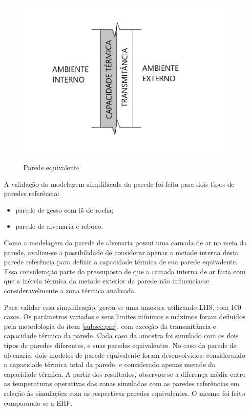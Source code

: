 \documentclass[brazil,hardcopy,openany,a5paper]{ufscthesis}
\begin{document}
		\begin{figure}[h]
			\centering
			\caption{Parede equivalente}
			\includegraphics[width=1\linewidth]{img/parede_eq.png}
			\label{fig:parede_eq}
		\end{figure}
	
		A validação da modelagem simplificada da parede foi feita para dois tipos de paredes referência:
		
		\begin{itemize}
			\item parede de gesso com lã de rocha;
			\item parede de alvenaria e reboco.
		\end{itemize}
		
		Como a modelagem da parede de alvenaria possui uma camada de ar no meio da parede, avaliou-se a possibilidade de considerar apenas a metade interna desta parede referência para definir a capacidade térmica de sua parede equivalente. Essa consideração parte do pressuposto de que a camada interna de ar faria com que a inércia térmica da metade exterior da parede não influenciasse consideravelmente a zona térmica analisada.
		
		Para validar essa simplificação, gerou-se uma amostra utilizando LHS, com 100 casos.
		Os parâmetros variados e seus limites mínimos e máximos foram definidos pela metodologia do item \ref{subsec:par}, com exceção da transmitância e capacidade térmica da parede.  %
		Cada caso da amostra foi simulado com os dois tipos de paredes diferentes, e suas paredes equivalentes. No caso da parede de alvenaria, dois modelos de parede equivalente foram desenvolvidos: considerando a capacidade térmica total da parede, e considerado apenas metade da capacidade térmica.
		A partir dos resultados, observou-se a diferença média entre as temperaturas operativas das zonas simuladas com as paredes referências em relação às simulações com as respectivas paredes equivalentes. O mesmo foi feito comparando-se a EHF.
		
\end{document}
